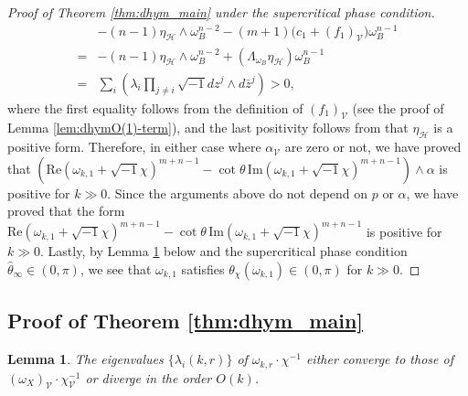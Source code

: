 \documentclass{amsart}
\numberwithin{equation}{section}
\theoremstyle{plain}
\newtheorem{lemma}[equation]{Lemma}
\theoremstyle{definition}
\theoremstyle{remark}
\begin{document}
\begin{proof}[Proof of Theorem \ref{thm:dhym_main} under the supercritical phase condition]
    \begin{align*}
        &-(n-1)\eta_{\mathcal{H}}\wedge\omega_B^{n-2}-(m+1)\big(c_1+(f_1)_{\mathcal{V}}\big)\omega_B^{n-1}\\
        =&-(n-1)\eta_{\mathcal{H}}\wedge\omega_B^{n-2}+(\Lambda_{\omega_B}\eta_\mathcal{H})\omega_B^{n-1}\\
        =&\sum_i\left(\lambda_i\prod_{j\neq i}\sqrt{-1}dz^j\wedge d\bar{z}^j\right)>0,
    \end{align*}
    where the first equality follows from the definition of $(f_1)_{\mathcal{V}}$ (see the proof of Lemma \ref{lem:dhymO(1)-term}), and the last positivity follows from that $\eta_{\mathcal{H}}$ is a positive form. Therefore, in either case where $\alpha_{\mathcal{V}}$ are zero or not, we have proved that $(\mathrm{Re}(\omega_{k,1}+\sqrt{-1}\chi)^{m+n-1}-\cot\theta\, \mathrm{Im}(\omega_{k,1}+\sqrt{-1}\chi)^{m+n-1})\wedge\alpha$ is positive for $k\gg0$. Since the arguments above do not depend on $p$ or $\alpha$, we have proved that the form $\mathrm{Re}(\omega_{k,1}+\sqrt{-1}\chi)^{m+n-1}-\cot\theta\, \mathrm{Im}(\omega_{k,1}+\sqrt{-1}\chi)^{m+n-1}$ is positive for $k\gg0$. Lastly, by Lemma \ref{lem:dhymevalues} below and the supercritical phase condition $\hat{\theta}_\infty\in(0,\pi)$, we see that $\omega_{k,1}$ satisfies $\theta_\chi(\omega_{k,1})\in(0,\pi)$ for $k\gg0$.
\end{proof}

\subsection{Proof of Theorem \ref{thm:dhym_main}}

\begin{lemma}\label{lem:dhymevalues}
    The eigenvalues $\{\lambda_i(k,r)\}$ of $\omega_{k,r}\cdot\chi^{-1}$ either converge to those of $(\omega_X)_\mathcal{V}\cdot\chi^{-1}_\mathcal{V}$ or diverge in the order $O(k)$.
\end{lemma}
\end{document}
